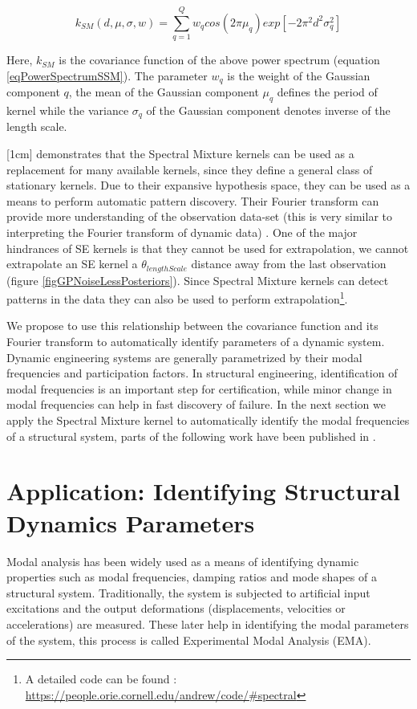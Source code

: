 \begin{equation}\label{eqCovarianceKSM}
k_{SM}(d, \mu, \sigma, w) = \sum_{q=1}^{Q}w_{q}cos(2\pi\mu_{q}) exp[-2\pi^{2}d^{2}\sigma_{q}^2]
\end{equation}

Here, $k_{SM}$ is the covariance function of the above power spectrum (equation \ref{eqPowerSpectrumSSM}). The parameter $w_{q}$ is the weight of the Gaussian component $q$, the mean of the Gaussian component $\mu_{q}$ defines the period of kernel while the variance $\sigma_{q}$ of the Gaussian component denotes inverse of the length scale. 

[1cm]
\cite{wilson2014thesis} demonstrates that the Spectral Mixture kernels can be used as a replacement for many available kernels, since they define a general class of stationary kernels. Due to their expansive hypothesis space, they can be used as a means to perform automatic pattern discovery. Their Fourier transform can provide more understanding of the observation data-set (this is very similar to interpreting the Fourier transform of dynamic data) \cite{wilson2013gaussian}. One of the major hindrances of SE kernels is that they cannot be used for extrapolation, we cannot extrapolate an SE kernel a $\theta_{lengthScale}$ distance away from the last observation (figure \ref{figGPNoiseLessPosteriors}). Since Spectral Mixture kernels can detect patterns in the data they can also be used to perform extrapolation\footnote{A detailed code can be found : \url{https://people.orie.cornell.edu/andrew/code/\#spectral}}. 

We propose to use this relationship between the covariance function and its Fourier transform to automatically identify parameters of a dynamic system. Dynamic engineering systems are generally parametrized by their modal frequencies and participation factors. In structural engineering, identification of modal frequencies is an important step for certification, while minor change in modal frequencies can help in fast discovery of failure. In the next section we apply the Spectral Mixture kernel to automatically identify the modal frequencies of a structural system, parts of the following work have been published in \cite{chiplunkar2017operational}.

\section{Application: Identifying Structural Dynamics Parameters}\label{subSecSMKernelApplication}
Modal analysis has been widely used as a means of identifying dynamic properties such as modal frequencies, damping ratios and mode shapes of a structural system. Traditionally, the system is subjected to artificial input excitations and the output deformations (displacements, velocities or accelerations) are measured. These later help in identifying the modal parameters of the system, this process is called Experimental Modal Analysis (EMA). 


